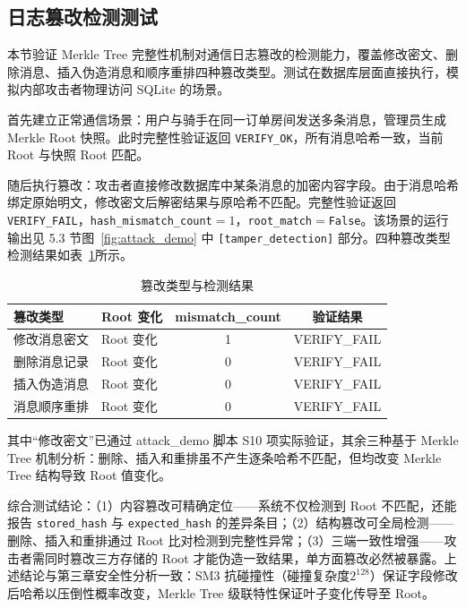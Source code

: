 \subsection{日志篡改检测测试}

本节验证 Merkle Tree 完整性机制对通信日志篡改的检测能力，覆盖修改密文、删除消息、插入伪造消息和顺序重排四种篡改类型。测试在数据库层面直接执行，模拟内部攻击者物理访问 SQLite 的场景。

首先建立正常通信场景：用户与骑手在同一订单房间发送多条消息，管理员生成 Merkle Root 快照。此时完整性验证返回 \texttt{VERIFY\_OK}，所有消息哈希一致，当前 Root 与快照 Root 匹配。

随后执行篡改：攻击者直接修改数据库中某条消息的加密内容字段。由于消息哈希绑定原始明文，修改密文后解密结果与原哈希不匹配。完整性验证返回 \texttt{VERIFY\_FAIL}，\texttt{hash\_mismatch\_count}$= 1$，\texttt{root\_match}$=$\texttt{False}。该场景的运行输出见 5.3 节图~\ref{fig:attack_demo} 中 \texttt{[tamper\_detection]} 部分。四种篡改类型检测结果如表~\ref{tab:tamper_compare}所示。

\begin{table}[H]
\centering
\caption{篡改类型与检测结果}
\label{tab:tamper_compare}
\small
\begin{tabular}{llcc}
\hline
\textbf{篡改类型} & \textbf{Root 变化} & \textbf{mismatch\_count} & \textbf{验证结果} \\
\hline
修改消息密文 & Root 变化 & 1 & VERIFY\_FAIL \\
删除消息记录 & Root 变化 & 0 & VERIFY\_FAIL \\
插入伪造消息 & Root 变化 & 0 & VERIFY\_FAIL \\
消息顺序重排 & Root 变化 & 0 & VERIFY\_FAIL \\
\hline
\end{tabular}
\end{table}

其中“修改密文”已通过 attack\_demo 脚本 S10 项实际验证，其余三种基于 Merkle Tree 机制分析：删除、插入和重排虽不产生逐条哈希不匹配，但均改变 Merkle Tree 结构导致 Root 值变化。

综合测试结论：（1）内容篡改可精确定位——系统不仅检测到 Root 不匹配，还能报告 \texttt{stored\_hash} 与 \texttt{expected\_hash} 的差异条目；（2）结构篡改可全局检测——删除、插入和重排通过 Root 比对检测到完整性异常；（3）三端一致性增强——攻击者需同时篡改三方存储的 Root 才能伪造一致结果，单方面篡改必然被暴露。上述结论与第三章安全性分析一致：SM3 抗碰撞性（碰撞复杂度$2^{128}$）保证字段修改后哈希以压倒性概率改变，Merkle Tree 级联特性保证叶子变化传导至 Root。
